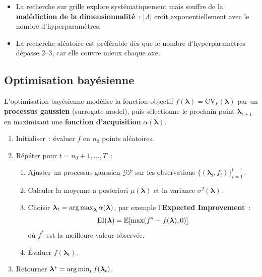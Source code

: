 \begin{bonnepratique}[title=\textbf{Grid Search vs Random Search}]
\begin{itemize}
  \item La recherche sur grille explore syst\'ematiquement mais souffre de la
    \textbf{mal\'ediction de la dimensionnalit\'e}~: $|\Lambda|$ cro\^it
    exponentiellement avec le nombre d'hyperparam\`etres.
  \item La recherche al\'eatoire est pr\'ef\'erable d\`es que le nombre
    d'hyperparam\`etres d\'epasse 2--3, car elle couvre mieux chaque axe.
\end{itemize}
\end{bonnepratique}

\subsection{Optimisation bay\'esienne}

\begin{definition}
L'optimisation bay\'esienne mod\'elise la fonction objectif
$f(\bm{\lambda}) = \text{CV}_k(\bm{\lambda})$ par un \textbf{processus
gaussien} (surrogate model), puis s\'electionne le prochain point
$\bm{\lambda}_{t+1}$ en maximisant une \textbf{fonction d'acquisition}
$\alpha(\bm{\lambda})$.
\end{definition}

\begin{algorithme}[title=\textbf{Optimisation bay\'esienne}]
\begin{enumerate}
  \item Initialiser~: \'evaluer $f$ en $n_0$ points al\'eatoires.
  \item R\'ep\'eter pour $t = n_0 + 1, \ldots, T$~:
    \begin{enumerate}
      \item Ajuster un processus gaussien $\mathcal{GP}$ sur les observations
        $\{(\bm{\lambda}_i, f_i)\}_{i=1}^{t-1}$.
      \item Calculer la moyenne a posteriori $\mu(\bm{\lambda})$ et la
        variance $\sigma^2(\bm{\lambda})$.
      \item Choisir $\bm{\lambda}_t = \operatorname*{arg\,max}_{\bm{\lambda}}
        \alpha(\bm{\lambda})$, par exemple l'\textbf{Expected Improvement}~:
        \begin{equation}
          \text{EI}(\bm{\lambda}) = \mathbb{E}\!\left[\max(f^* - f(\bm{\lambda}), 0)
          \right]
        \end{equation}
        o\`u $f^*$ est la meilleure valeur observ\'ee.
      \item \'Evaluer $f(\bm{\lambda}_t)$.
    \end{enumerate}
  \item Retourner $\bm{\lambda}^* = \operatorname*{arg\,min}_t f(\bm{\lambda}_t)$.
\end{enumerate}
\end{algorithme}

